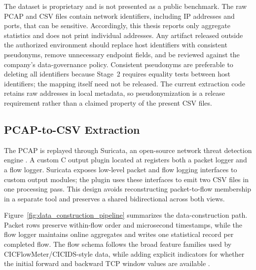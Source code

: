 The dataset is proprietary and is not presented as a public benchmark. The raw
PCAP and CSV files contain network identifiers, including IP addresses and
ports, that can be sensitive. Accordingly, this thesis reports only aggregate
statistics and does not print individual addresses. Any artifact released
outside the authorized environment should replace host identifiers with
consistent pseudonyms, remove unnecessary endpoint fields, and be reviewed
against the company's data-governance policy. Consistent pseudonyms are
preferable to deleting all identifiers because Stage~2 requires equality tests
between host identifiers; the mapping itself need not be released. The current
extraction code retains raw addresses in local metadata, so pseudonymization is
a release requirement rather than a claimed property of the present CSV files.

\subsection{PCAP-to-CSV Extraction}
\label{subsec:pcap_extraction}

The PCAP is replayed through Suricata, an open-source network threat detection
engine \cite{Roesch1999,SuricataGuide2026}. A custom C output plugin located at
 registers both a packet logger and
a flow logger. Suricata exposes low-level packet and flow logging interfaces to
custom output modules; the plugin uses these interfaces to emit two CSV files
in one processing pass. This design avoids reconstructing packet-to-flow
membership in a separate tool and preserves a shared bidirectional
 across both views.

Figure~\ref{fig:data_construction_pipeline} summarizes the data-construction
path. Packet rows preserve within-flow order and microsecond timestamps, while
the flow logger maintains online aggregates and writes one statistical record
per completed flow. The flow schema follows the broad feature families used by
CICFlowMeter/CICIDS-style data, while adding explicit indicators for whether
the initial forward and backward TCP window values are available
\cite{Sharafaldin2018CICIDS}.

